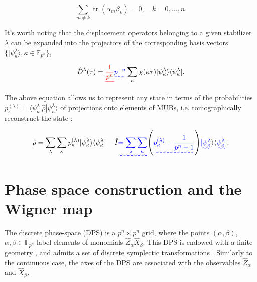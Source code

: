 \documentclass[quantumrep,article,submit,pdftex,moreauthors]{Definitions/mdpi}
\DeclareMathOperator{\tr}{tr}
\providecommand{\DIFadd}[1]{{\protect\color{blue}\uwave{#1}}} %
\providecommand{\DIFdel}[1]{{\protect\color{red}\sout{#1}}}                      %
\providecommand{\DIFaddbegin}{} %
\providecommand{\DIFaddend}{} %
\providecommand{\DIFdelbegin}{} %
\providecommand{\DIFdelend}{} %
\begin{document}
\begin{equation*}
  \sum_{m \neq k} \tr(\alpha_{m}\beta_{k}) = 0, \quad k = 0,...,n.
\end{equation*}

It's worth noting that the displacement operators belonging to a given
stabilizer $\lambda$ can be expanded into the projectors of the corresponding
basis vectors $\{|\psi_{\kappa}^{\lambda}\rangle,\kappa \in
\mathbb{F}_{p^{n}}\}$,

\begin{equation}
  \hat{D}^{\lambda }(\tau )
  = \DIFdelbegin \DIFdel{\frac{1}{p^{n}} }\DIFdelend \DIFaddbegin \DIFadd{p^{-n} }\DIFaddend \sum_{\kappa }\chi(\kappa\tau)
  |\psi_{\kappa }^{\lambda } \rangle \langle \psi_{\kappa }^{\lambda }|.
  \label{Dexp}
\end{equation}

The above equation allows us to represent any state in terms of the
probabilities $p_{\kappa}^{(\lambda)} = \langle
\psi_{\kappa}^{\lambda}|\hat{\rho}|\psi_{\kappa}^{\lambda}\rangle$ of
projections onto elements of MUBs, i.e. tomographically reconstruct the state
\cite{gibbons,galvao,cormick,ivanovic,DFW11,DFW12,Durt2006}:

\begin{equation}
  \hat{\rho}
  = \sum_{\lambda}\sum_{\kappa}
  p_{\kappa}^{(\lambda)} |\psi_{\kappa}^{\lambda}\rangle
  \langle \psi_{\kappa}^{\lambda}| - \hat{I}
  \DIFaddbegin \DIFadd{= \sum_{\lambda }\sum_{\kappa}}\left(
    \DIFadd{p_{\kappa }^{(\lambda)}-\frac{1}{p^{n}+1}
  }\right)
  \DIFadd{|\psi_{\kappa}^{\lambda }}\rangle \langle \DIFadd{\psi_{\kappa}^{\lambda}|}\DIFaddend .
  \label{tom r}
\end{equation}


\DIFaddbegin 

\DIFaddend \section{Phase space construction and the Wigner map}

The discrete phase-space (DPS) \cite{gibbons,galvao,cormick,DFW11,DFW12} is a
$p^{n} \times p^{n}$ grid, where the points $(\alpha ,\beta )$, $\alpha,\beta
\in \mathbb{F}_{p^{n}}$ label elements of monomials
$\hat{Z}_{\alpha}\hat{X}_{\beta}$. This DPS is endowed with a finite geometry
\cite{gibbons,galvao,cormick,DFW11,DFW12,FF}, and admits a set of discrete
symplectic transformations \cite{DFW2-1,DFW2-2,DFW2-3,DFW2-4,klimov06}.
Similarly to the continuous case, the axes of the DPS are associated with the
observables $\hat{Z}_{\alpha}$ and $\hat{X}_{\beta}$.
\end{document}
